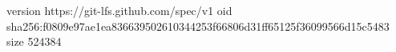version https://git-lfs.github.com/spec/v1
oid sha256:f0809e97ae1ea836639502610344253f66806d31ff65125f36099566d15c5483
size 524384
